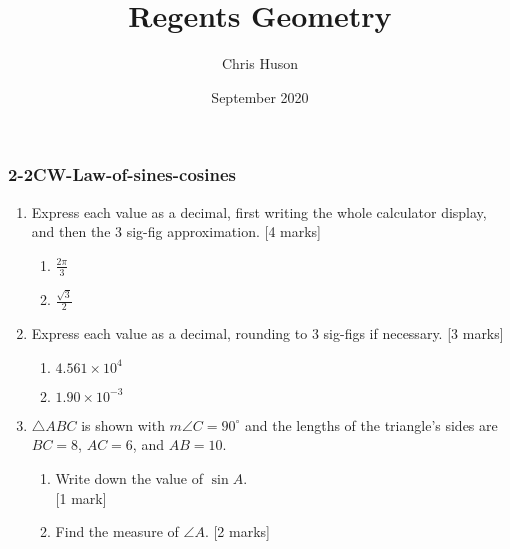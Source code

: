 \documentclass[12pt, twoside]{article}
\title{Regents Geometry}
\author{Chris Huson}
\date{September 2020}
\begin{document}
\subsubsection*{2-2CW-Law-of-sines-cosines}
\begin{enumerate}
\item Express each value as a decimal, first writing the whole calculator display, and then the 3 sig-fig approximation. \hfill [4 marks]
  \begin{multicols}{2}
    \begin{enumerate}
    \item $\displaystyle \frac{2\pi}{3}$
    \item $\displaystyle \frac{\sqrt{3}}{2}$
    \end{enumerate}
  \end{multicols}

\item Express each value as a decimal, rounding to 3 sig-figs if necessary. \hfill [3 marks]
  \begin{multicols}{2}
    \begin{enumerate}
    \item $4.561 \times 10^4$
    \item $1.90 \times 10^{-3}$
    \end{enumerate}
  \end{multicols}

\item $\triangle ABC$ is shown with $m\angle C=90^\circ$ and the lengths of the triangle's sides are $BC=8$, $AC=6$, and $AB=10$.
  \begin{multicols}{2}
        \begin{enumerate}
        \item Write down the value of $\sin A$.  \\ \hfill [1 mark]\vspace{1cm}
        \item Find the measure of $\angle A$.  \hfill [2 marks] \vspace{1cm}
      \end{enumerate}
    \end{multicols}


\end{enumerate}
\end{document}
